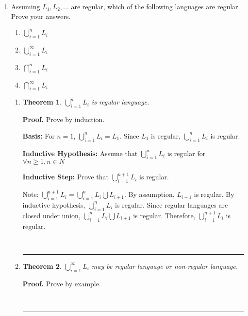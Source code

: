 \documentclass{article}%
\newtheorem{theorem}{Theorem}
\newenvironment{proof}[1][Proof]{\textbf{#1.} }{\ \rule{0.5em}{0.5em}}
\begin{document}
\begin{enumerate}


	\item Assuming $L_1 ,L_2 ,...$ are regular, which of the following languages are regular. Prove your answers.	
	\begin{enumerate}
		\item  $\bigcup\limits_{i = 1}^n {L_i } $
		\item  $\bigcup\limits_{i = 1}^\infty  {L_i } $
	    \item  $\bigcap\limits_{i = 1}^n {L_i } $
		\item  $\bigcap\limits_{i = 1}^\infty  {L_i } $
	\end{enumerate}
	
	\begin{enumerate}
    \item 
    \begin{theorem}
     $\bigcup\limits_{i = 1}^n {L_i } $ is regular language.
    
    \end{theorem}	
    \begin{proof}
    Prove by induction.
    
    \textbf{Basis:} For $n = 1$, $\bigcup\limits_{i = 1}^n {L_i }=L_1$. Since $L_1$ is regular, $\bigcup\limits_{i = 1}^n {L_i }$ is regular.
     
    \textbf{Inductive Hypothesis:} Assume that $\bigcup\limits_{i = 1}^n {L_i }$ is regular for $\forall n \geq 1, n \in N$
    
    \textbf{Inductive Step:} Prove that $\bigcup\limits_{i = 1}^{n+1} {L_i }$ is regular.
    
    Note: $\bigcup\limits_{i = 1}^{n+1} {L_i } = \bigcup\limits_{i = 1}^n {L_i } \bigcup L_{i+1}$. By assumption, $L_{i+1}$ is regular. By inductive hypothesis, $\bigcup\limits_{i = 1}^n {L_i }$ is regular. Since regular languages are  closed under union, $\bigcup\limits_{i = 1}^n {L_i } \bigcup L_{i+1}$ is regular. Therefore, $\bigcup\limits_{i = 1}^{n+1} {L_i }$ is regular.
    
    \end{proof}
    
     \item 
    \begin{theorem}
     $\bigcup\limits_{i = 1}^\infty {L_i } $ may be regular language or non-regular language.
    
    \end{theorem}	
    \begin{proof}
    Prove by example.
    

\end{proof}
\end{enumerate}
\end{enumerate}
\end{document}
